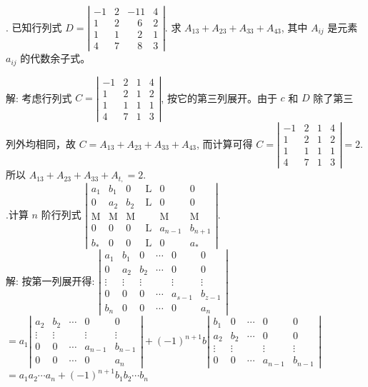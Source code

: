 \documentclass{article}
\begin{document}
{.} 已知行列式 $D=\left|\begin{array}{llll}-1 & 2 & -11 & 4 \\ 1 & 2 & \quad6 & 2 \\ 1 & 1 & \quad2 & 1 \\ 4 & 7 & \quad8 & 3\end{array}\right| .$ 求 $A_{13}+A_{23}+A_{33}+A_{43}$, 其中 $A_{ij}$ 是元素
$a_{ij}$ 的代数余子式。

解: 考虑行列式 $C=\left|\begin{array}{cccc}-1 & 2 & 1 & 4 \\ 1 & 2 & 1 & 2 \\ 1 & 1 & 1 & 1 \\ 4 & 7 & 1 & 3\end{array}\right|$, 按它的第三列展开。由于 $c$ 和 $D$ 除了第三
列外均相同，故 $C=A_{13}+A_{23}+A_{33}+A_{43}$, 而计算可得
$C=\left|\begin{array}{llll}-1 & 2 & 1 & 4 \\ 1 & 2 & 1 & 2 \\ 1 & 1 & 1 & 1 \\ 4 & 7 & 1 & 3\end{array}\right|=2 .$ 所以 $A_{13}+A_{23}+A_{33}+A_{t,}=2 .$\\

{.}计算 $n$ 阶行列式 $\left|\begin{array}{llllll}a_{1} & b_{1} & 0 & \mathrm{~L} & 0 & 0 \\ 0 & a_{2} & b_{2} & \mathrm{~L} & 0 & 0 \\ \mathrm{M} & \mathrm{M} & \mathrm{M} & & \mathrm{M} & \mathrm{M} \\ 0 & 0 & 0 & \mathrm{~L} & a_{n-1} & b_{n+1} \\ b_{*} & 0 & 0 & \mathrm{~L} & 0 & a_{*}\end{array}\right|$.\\
解: 按第一列展开得:
$\left|\begin{array}{cccccc}a_{1} & b_{1} & 0 & \cdots & 0 & 0 \\ 0 & a_{2} & b_{2} & \cdots & 0 & 0 \\ \vdots & \vdots & \vdots & & \vdots & \vdots \\ 0 & 0 & 0 & \cdots & a_{s-1} & b_{z-1} \\ b_{n} & 0 & 0 & \cdots & 0 & a_{n}\end{array}\right|$
$=a_{1}\left|\begin{array}{ccccc}a_{2} & b_{2} & \cdots & 0 & 0 \\ \vdots & \vdots & & \vdots & \vdots \\ 0 & 0 & \cdots & a_{n-1} & b_{n-1} \\ 0 & 0 & \cdots & 0 & a_{n}\end{array}\right|+(-1)^{n+1} b\left|\begin{array}{ccccc}b_{1} & 0 & \cdots & 0 & 0 \\ a_{2} & b_{2} & \cdots & 0 & 0 \\ \vdots & \vdots & & \vdots & \vdots \\ 0 & 0 & \cdots & a_{n-1} & b_{n-1}\end{array}\right|$
$=a_{1} a_{2} \cdots a_{n}+(-1)^{n+1} b_{1} b_{2} \cdots b_{n}$
\end{document}
